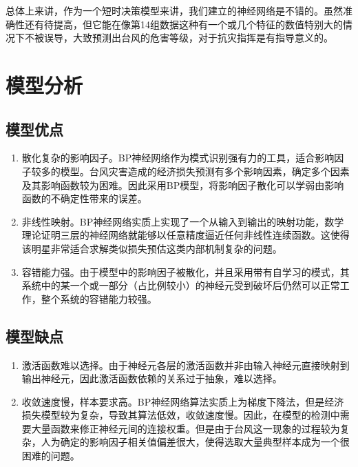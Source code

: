\documentclass[12pt]{article}
\begin{document}
总体上来讲，作为一个短时决策模型来讲，我们建立的神经网络是不错的。虽然准确性还有待提高，但它能在像第14组数据这种有一个或几个特征的数值特别大的情况下不被误导，大致预测出台风的危害等级，对于抗灾指挥是有指导意义的。

\vspace{20pt}

\section{模型分析}

\subsection{模型优点}

\begin{enumerate}
\item 散化复杂的影响因子。BP神经网络作为模式识别强有力的工具，适合影响因子较多的模型。台风灾害造成的经济损失预测有多个影响因素，确定多个因素及其影响函数较为困难。因此采用BP模型，将影响因子散化可以学弱由影响函数的不确定性带来的误差。
\item 非线性映射。BP神经网络实质上实现了一个从输入到输出的映射功能，数学理论证明三层的神经网络就能够以任意精度逼近任何非线性连续函数。这使得该明星非常适合求解类似损失预估这类内部机制复杂的问题。
\item 容错能力强。由于模型中的影响因子被散化，并且采用带有自学习的模式，其系统中的某一个或一部分（占比例较小）的神经元受到破坏后仍然可以正常工作，整个系统的容错能力较强。

\end{enumerate}

\subsection{模型缺点}

\begin{enumerate}
\item 激活函数难以选择。由于神经元各层的激活函数并非由输入神经元直接映射到输出神经元，因此激活函数依赖的关系过于抽象，难以选择。
\item 收敛速度慢，样本要求高。BP神经网络算法实质上为梯度下降法，但是经济损失模型较为复杂，导致其算法低效，收敛速度慢。因此，在模型的检测中需要大量函数来修正神经元间的连接权重。但是由于台风这一现象的过程较为复杂，人为确定的影响因子相关值偏差很大，使得选取大量典型样本成为一个很困难的问题。

\end{enumerate}
\end{document}
